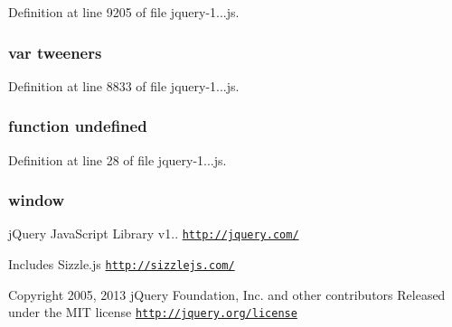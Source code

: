 Definition at line 9205 of file jquery-\/1...\+js.

\subsubsection[{\texorpdfstring{tweeners}{tweeners}}]{\setlength{\rightskip}{0pt plus 5cm}var tweeners}\hypertarget{_scripts_2jquery-1_810_82_8js_a948afd2431eec272c99689edddfb6850}{}\label{_scripts_2jquery-1_810_82_8js_a948afd2431eec272c99689edddfb6850}


Definition at line 8833 of file jquery-\/1...\+js.

\subsubsection[{\texorpdfstring{undefined}{undefined}}]{\setlength{\rightskip}{0pt plus 5cm}function undefined}\hypertarget{_scripts_2jquery-1_810_82_8js_a08113a236cc18d2a9d5ce27e638012be}{}\label{_scripts_2jquery-1_810_82_8js_a08113a236cc18d2a9d5ce27e638012be}


Definition at line 28 of file jquery-\/1...\+js.

\subsubsection[{\texorpdfstring{window}{window}}]{\setlength{\rightskip}{0pt plus 5cm}window}\hypertarget{_scripts_2jquery-1_810_82_8js_a04a8a2bbfa9c15500892b8e5033d625b}{}\label{_scripts_2jquery-1_810_82_8js_a04a8a2bbfa9c15500892b8e5033d625b}
j\+Query Java\+Script Library v1.. \href{http://jquery.com/}{\tt http\+://jquery.\+com/}

Includes Sizzle.\+js \href{http://sizzlejs.com/}{\tt http\+://sizzlejs.\+com/}

Copyright 2005, 2013 j\+Query Foundation, Inc. and other contributors Released under the M\+IT license \href{http://jquery.org/license}{\tt http\+://jquery.\+org/license}

